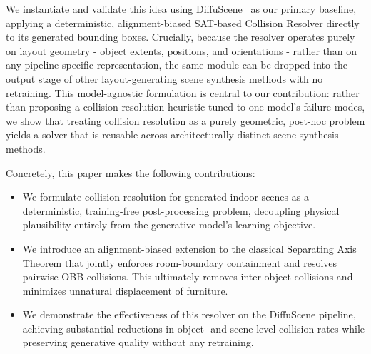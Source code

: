 We instantiate and validate this idea using DiffuScene~\cite{tang2024diffuscenedenoisingdiffusionmodels} as our primary baseline, applying a deterministic, alignment-biased SAT-based Collision Resolver directly to its generated bounding boxes. Crucially, because the resolver operates purely on layout geometry - object extents, positions, and orientations - rather than on any pipeline-specific representation, the same module can be dropped into the output stage of other layout-generating scene synthesis methods with no retraining. This model-agnostic formulation is central to our contribution: rather than proposing a collision-resolution heuristic tuned to one model's failure modes, we show that treating collision resolution as a purely geometric, post-hoc problem yields a solver that is reusable across architecturally distinct scene synthesis methods.

Concretely, this paper makes the following contributions:
\begin{itemize}
    \item We formulate collision resolution for generated indoor scenes as a deterministic, training-free post-processing problem, decoupling physical plausibility entirely from the generative model's learning objective.
    \item We introduce an alignment-biased extension to the classical Separating Axis Theorem that jointly enforces room-boundary containment and resolves pairwise OBB collisions. This ultimately removes inter-object collisions and minimizes unnatural displacement of furniture.
    \item We demonstrate the effectiveness of this resolver on the DiffuScene pipeline, achieving substantial reductions in object- and scene-level collision rates while preserving generative quality without any retraining.
\end{itemize}